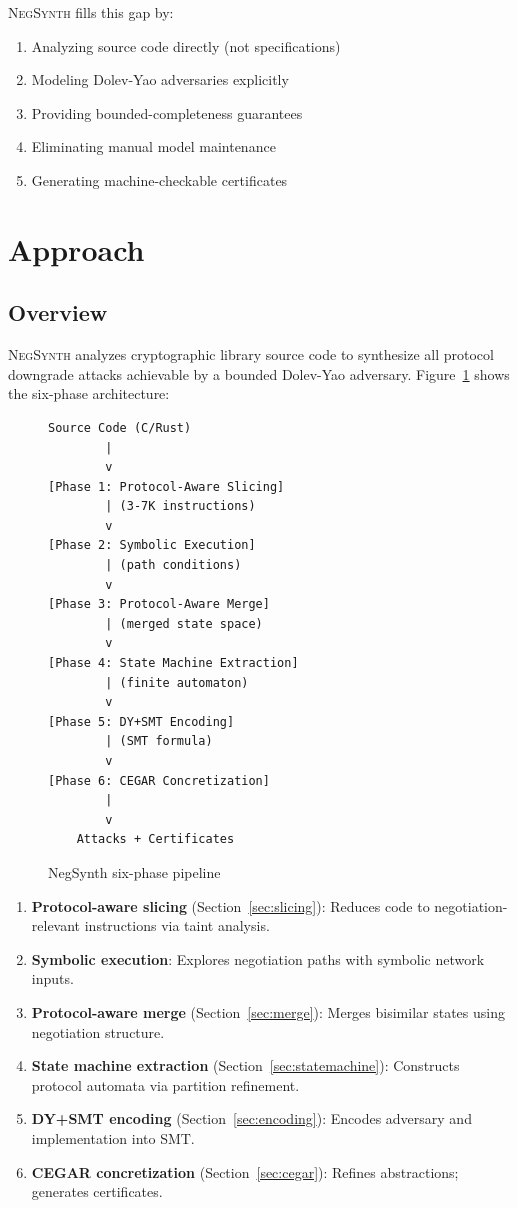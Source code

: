 \documentclass[10pt,twocolumn]{article}
\begin{document}
\textsc{NegSynth} fills this gap by:
\begin{enumerate}[leftmargin=*,noitemsep]
\item Analyzing source code directly (not specifications)
\item Modeling Dolev-Yao adversaries explicitly
\item Providing bounded-completeness guarantees
\item Eliminating manual model maintenance
\item Generating machine-checkable certificates
\end{enumerate}

\section{Approach}
\label{sec:approach}

\subsection{Overview}

\textsc{NegSynth} analyzes cryptographic library source code to synthesize all protocol downgrade attacks achievable by a bounded Dolev-Yao adversary. Figure~\ref{fig:pipeline} shows the six-phase architecture:

\begin{figure}[t]
\centering
\begin{verbatim}
Source Code (C/Rust)
        |
        v
[Phase 1: Protocol-Aware Slicing]
        | (3-7K instructions)
        v
[Phase 2: Symbolic Execution]
        | (path conditions)
        v
[Phase 3: Protocol-Aware Merge]
        | (merged state space)
        v
[Phase 4: State Machine Extraction]
        | (finite automaton)
        v
[Phase 5: DY+SMT Encoding]
        | (SMT formula)
        v
[Phase 6: CEGAR Concretization]
        |
        v
    Attacks + Certificates
\end{verbatim}
\caption{NegSynth six-phase pipeline}
\label{fig:pipeline}
\end{figure}

\begin{enumerate}[leftmargin=*,noitemsep]
\item \textbf{Protocol-aware slicing} (Section~\ref{sec:slicing}): Reduces code to negotiation-relevant instructions via taint analysis.
\item \textbf{Symbolic execution}: Explores negotiation paths with symbolic network inputs.
\item \textbf{Protocol-aware merge} (Section~\ref{sec:merge}): Merges bisimilar states using negotiation structure.
\item \textbf{State machine extraction} (Section~\ref{sec:statemachine}): Constructs protocol automata via partition refinement.
\item \textbf{DY+SMT encoding} (Section~\ref{sec:encoding}): Encodes adversary and implementation into SMT.
\item \textbf{CEGAR concretization} (Section~\ref{sec:cegar}): Refines abstractions; generates certificates.
\end{enumerate}
\end{document}
